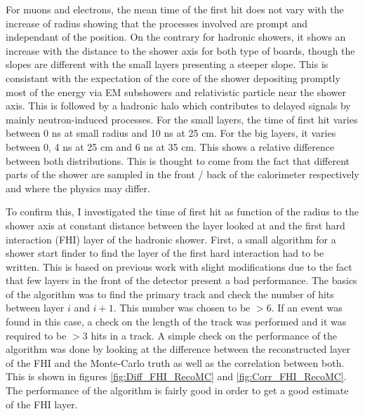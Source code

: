 For muons and electrons, the mean time of the first hit does not vary with the increase of radius showing that the processes involved are prompt and independant of the position. On the contrary for hadronic showers, it shows an increase with the distance to the shower axis for both type of boards, though the slopes are different with the small layers presenting a steeper slope. This is consistant with the expectation of the core of the shower depositing promptly most of the energy via EM subshowers and relativistic particle near the shower axis. This is followed by a hadronic halo which contributes to delayed signals by mainly neutron-induced processes. For the small layers, the time of first hit varies between 0 ns at small radius and 10 ns at 25 cm. For the big layers, it varies between 0, 4 ns at 25 cm and 6 ns at 35 cm. This shows a relative difference between both distributions. This is thought to come from the fact that different parts of the shower are sampled in the front / back of the calorimeter respectively and where the physics may differ.

To confirm this, I investigated the time of first hit as function of the radius to the shower axis at constant distance between the layer looked at and the first hard interaction (FHI) layer of the hadronic shower. First, a small algorithm for a shower start finder to find the layer of the first hard interaction had to be written. This is based on previous work \cite{} with slight modifications due to the fact that few layers in the front of the detector present a bad performance. The basics of the algorithm was to find the primary track and check the number of hits between layer $i$ and $i+1$. This number was chosen to be $>6$. If an event was found in this case, a check on the length of the track was performed and it was required to be $>3$ hits in a track. A simple check on the performance of the algorithm was done by looking at the difference between the reconstructed layer of the FHI and the Monte-Carlo truth as well as the correlation between both. This is shown in figures \ref{fig:Diff_FHI_RecoMC} and \ref{fig:Corr_FHI_RecoMC}. The performance of the algorithm is fairly good in order to get a good estimate of the FHI layer.

